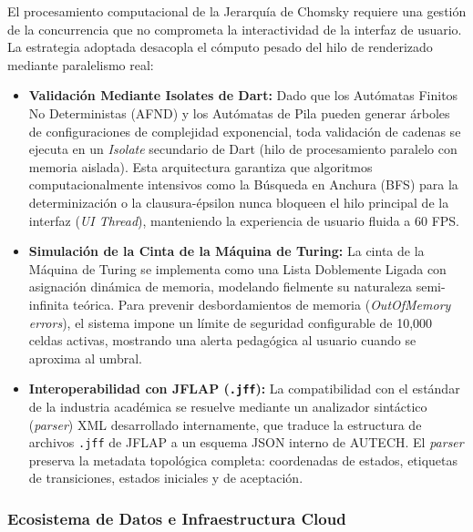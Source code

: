 El procesamiento computacional de la Jerarquía de Chomsky requiere una gestión de la concurrencia que no comprometa la interactividad de la interfaz de usuario. La estrategia adoptada desacopla el cómputo pesado del hilo de renderizado mediante paralelismo real:
\begin{itemize}
    \item \textbf{Validación Mediante Isolates de Dart:} Dado que los Autómatas Finitos No Deterministas (AFND) y los Autómatas de Pila pueden generar árboles de configuraciones de complejidad exponencial, toda validación de cadenas se ejecuta en un \textit{Isolate} secundario de Dart (hilo de procesamiento paralelo con memoria aislada). Esta arquitectura garantiza que algoritmos computacionalmente intensivos como la Búsqueda en Anchura (BFS) para la determinización o la clausura-épsilon nunca bloqueen el hilo principal de la interfaz (\textit{UI Thread}), manteniendo la experiencia de usuario fluida a 60 FPS.
    \item \textbf{Simulación de la Cinta de la Máquina de Turing:} La cinta de la Máquina de Turing se implementa como una Lista Doblemente Ligada con asignación dinámica de memoria, modelando fielmente su naturaleza semi-infinita teórica. Para prevenir desbordamientos de memoria (\textit{OutOfMemory errors}), el sistema impone un límite de seguridad configurable de 10,000 celdas activas, mostrando una alerta pedagógica al usuario cuando se aproxima al umbral.
    \item \textbf{Interoperabilidad con JFLAP (\texttt{.jff}):} La compatibilidad con el estándar de la industria académica se resuelve mediante un analizador sintáctico (\textit{parser}) XML desarrollado internamente, que traduce la estructura de archivos \texttt{.jff} de JFLAP a un esquema JSON interno de AUTECH. El \textit{parser} preserva la metadata topológica completa: coordenadas de estados, etiquetas de transiciones, estados iniciales y de aceptación.
\end{itemize}

\subsubsection{Ecosistema de Datos e Infraestructura Cloud}

